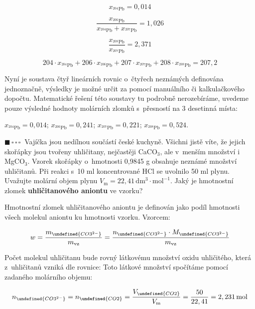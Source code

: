 \documentclass{book}
\let\ch\undefined
\newcommand{\jeden}{$\blacksquare \, \square \, \square \, \square \; \; $}
\renewenvironment{quotation}{\par}{\par} %
\begin{document}
\[
x_{^{204}\mathrm{Pb}}=0,014
\]

\[
\frac{x_{^{206}\mathrm{Pb}}}{x_{^{204}\mathrm{Pb}}+x_{^{207}\mathrm{Pb}}}=1,026
\]

\[
\frac{x_{^{208}\mathrm{Pb}}}{x_{^{207}\mathrm{Pb}}}=2,371
\]

\[
204\cdot
x_{^{204}\mathrm{Pb}}+206\cdot
x_{^{206}\mathrm{Pb}}+207\cdot
x_{^{207}\mathrm{Pb}}+208\cdot
x_{^{208}\mathrm{Pb}}=207,2
\]

Nyní je soustava čtyř lineárních rovnic o~čtyřech neznámých definována
jednoznačně, výsledky je možné určit za pomocí manuálního či kalkulačkového
dopočtu. Matematické řešení této soustavy tu podrobně nerozebíráme, uvedeme pouze výsledné hodnoty molárních zlomků s~přesností na 3 desetinná místa:

$x_{^{204}\mathrm{Pb}}=0,014$; $x_{^{206}\mathrm{Pb}}=0,241$; $x_{^{207}\mathrm{Pb}}=0,221$;
$x_{^{208}\mathrm{Pb}}=0,524$. 

\hrulefill  %
\begin{quotation}
\jeden Vajíčka jsou nedílnou součástí české kuchyně. Všichni jistě víte,
že jejich skořápky jsou tvořeny uhličitany, nejčastěji CaCO$_{3}$,
ale v~menším množství i MgCO$_{3}$. Vzorek skořápky o~hmotnosti 0,9845
g obsahuje neznámé množství uhličitanů. Při reakci s~10 ml koncentrované
HCl se uvolnilo 50 ml plynu. Uvažujte molární objem plynu $V_{\mathrm{ m}}=22,41\,\mathrm{dm^{3}\cdot mol^{-1}}$.
Jaký je hmotnostní zlomek \textbf{uhličitanového aniontu} ve vzorku?
\end{quotation} \dotfill \par 
Hmotnostní zlomek uhličitanového aniontu je definován jako podíl hmotnosti
všech molekul aniontu ku hmotnosti vzorku. Vzorcem:

\[
w=\frac{m_{\ch{CO3^{2-}}}}{m_{\mathrm{vz}}}
=\frac{n_{\ch{CO3^{2-}}}\cdot M_{\ch{CO3^{2-}}}}{m_{\mathrm{vz}}}
\]

Počet molekul uhličitanu bude rovný látkovému množství oxidu uhličitého,
která z~uhličitanů vzniká dle rovnice:
\shorthandoff{-}
\ch{CO3^{2-} + 2 H+ -> CO2 + H2O}
\shorthandon{-}
Toto látkové množství spočítáme pomocí zadaného molárního objemu:

\[
n_{\ch{CO3^{2-}}}=n_{\ch{CO2}}=\frac{V_{\ch{CO2}}}{V_{\mathrm{m}}}=\frac{50}{22,41}= 2,231\,\mathrm{mol}
\]
\end{document}
